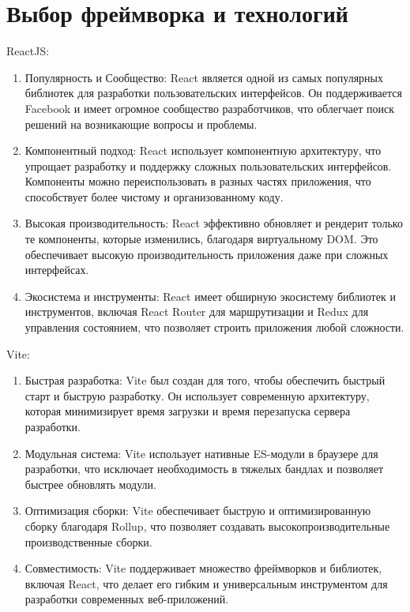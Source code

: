 \documentclass[a4paper,12pt]{article}
\begin{document}
    \section{Выбор фреймворка и технологий}\label{sec:---}
    ReactJS:
    \begin{enumerate}
        \item Популярность и Сообщество: React является одной из самых популярных библиотек для разработки пользовательских интерфейсов.
        Он поддерживается Facebook и имеет огромное сообщество разработчиков, что облегчает поиск решений на возникающие вопросы и проблемы.

        \item Компонентный подход: React использует компонентную архитектуру, что упрощает разработку и поддержку сложных пользовательских интерфейсов.
        Компоненты можно переиспользовать в разных частях приложения, что способствует более чистому и организованному коду.

        \item Высокая производительность: React эффективно обновляет и рендерит только те компоненты, которые изменились, благодаря виртуальному DOM\@.
        Это обеспечивает высокую производительность приложения даже при сложных интерфейсах.

        \item Экосистема и инструменты: React имеет обширную экосистему библиотек и инструментов, включая React Router для маршрутизации и Redux для управления состоянием, что позволяет строить приложения любой сложности.

    \end{enumerate}


    Vite:
    \begin{enumerate}
        \item Быстрая разработка: Vite был создан для того, чтобы обеспечить быстрый старт и быструю разработку.
        Он использует современную архитектуру, которая минимизирует время загрузки и время перезапуска сервера разработки.


        \item Модульная система: Vite использует нативные ES-модули в браузере для разработки, что исключает необходимость в тяжелых бандлах и позволяет быстрее обновлять модули.

        \item Оптимизация сборки: Vite обеспечивает быструю и оптимизированную сборку благодаря Rollup, что позволяет создавать высокопроизводительные производственные сборки.

        \item Совместимость: Vite поддерживает множество фреймворков и библиотек, включая React, что делает его гибким и универсальным инструментом для разработки современных веб-приложений.

    \end{enumerate}
\end{document}
